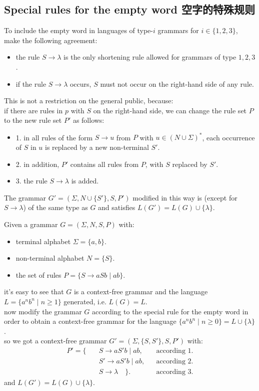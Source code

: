 \documentclass[a4paper,11pt,utf8]{article}
\newcommand{\newindent}{\\ \hspace*{\parindent}}
\newcommand{\lineindent}{\hspace*{\parindent}}
\begin{document}
\subsection{Special rules for the empty word 空字的特殊规则}
To include the empty word in languages of type-$i$ grammars for $i \in \{1,2,3\}$, make the following agreement:
\begin{itemize}
    \item the rule $S \to \lambda$ is the only shortening rule allowed for grammars of type $1,2,3$.
    \item if the rule $S \to \lambda$ occurs, $S$ must not occur on the right-hand side of any rule.
\end{itemize}
\lineindent This is not a restriction on the general public, because: \\ \lineindent
if there are rules in $p$ with $S$ on the right-hand side, we can change the rule set $P$ to the new rule set $P'$ as follows:
\begin{itemize}
    \item 1. in all rules of the form $S \to u$ from $P$ with $u \in (N \cup \Sigma)^*$, each occurrence of $S$ in $u$ is replaced by a new non-terminal $S'$.
    \item 2. in addition, $P'$ contains all rules from $P$, with $S$ replaced by $S'$.
    \item 3. the rule $S \to \lambda$ is added.
\end{itemize}
\lineindent The grammar $G' = (\Sigma, N \cup \{S'\}, S, P')$ modified in this way is (except for $S \to \lambda$) of the same type as $G$ and satisfies $L(G') = L(G) \cup \{\lambda\}$.
\begin{tcolorbox}[title=example,colback=white,colframe=black,width=\textwidth,arc=0pt]
    Given a grammar $G = (\Sigma, N, S, P)$ with:
    \begin{itemize}
        \item terminal alphabet $\Sigma = \{a,b\}$.
        \item non-terminal alphabet $N = \{S\}$.
        \item the set of rules $P = \{S \to aSb \mid ab\}$.
    \end{itemize}
    it's easy to see that $G$ is a context-free grammar and the language $L = \{a^nb^n \mid n \geq 1\}$ generated, i.e. $L(G) = L$. \newindent
    now modify the grammar $G$ according to the special rule for the empty word in order to obtain a context-free grammar for the language $\{a^nb^n \mid n \geq 0\} = L \cup \{\lambda\}$. \newindent
    so we got a context-free grammar $G' = (\Sigma, \{S,S'\}, S, P')$ with:
    \[
        \begin{aligned}
            P' = \{ \quad &S \to a S' b \mid ab, &&\text{according 1.}\\[1ex]
            &S' \to a S' b \mid ab, &&\text{according 2.}\\[1ex]
            &S \to \lambda \quad\}. &&\text{according 3.}
        \end{aligned}
    \]
    \lineindent and $L(G') = L(G) \cup \{\lambda\}$.
\end{tcolorbox}
\end{document}
